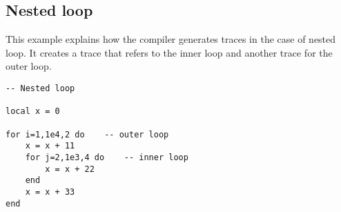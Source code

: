 \begin{comment}
In Lines 0003-0008 contain the loop unrolled and lines 00010-0015 the actual loop. It is performed the modulus operation (MOD), it is checked that its result is not equal to zero (NE), then the loop is incremented (ADD) and  it is checked the loop termination (LE).


As it is showed in the dump here there are  two traces: the original root trace (TRACE 1) and a new trace (TRACE 2) called side trace. This is necessary because there is a branch (if-statement) in the code and traces are not allowed to have internal branches. The root trace will internally handle the case when the loop index is not multiple of 10 but it will exit to the side trace otherwise. The side trace then rejoins the root trace as is written in the dump \texttt{---- TRACE 2 stop -> 1}. The effect is that the loop alternates between saying inside the root trace and exiting to the side trace. Line 0005 contains a guard indicated by the symbol $>$ that is a possible exit from the trace.

TRACE 2:

The first two lines of TRACE 2 are simple init of the registers. Lines 0003-0009 take the reference and load \textit{x}. Then, in line 0010 it is executed $x=x+1$ and the result is stored (line 0011). Finally the loop is incremented (line 0012) and it is checked the loop termination (line 0013). The last line 0014 converts the number in integer.\\
\texttt{Ref. https://github.com/lukego/blog/issues/}\\
\end{comment}

\subsection{Nested loop}
\label{subsec:nested-loop}
This example explains how the compiler generates traces in the case of nested loop. It creates a trace that refers to the inner loop  and another trace for the outer loop.
\begin{mdframed}[style=LuaStyleFrame]
\begin{lstlisting}[style=LuaStyle]
-- Nested loop

local x = 0

for i=1,1e4,2 do    -- outer loop
    x = x + 11
    for j=2,1e3,4 do    -- inner loop
        x = x + 22
    end
    x = x + 33
end
\end{lstlisting}
\end{mdframed}


